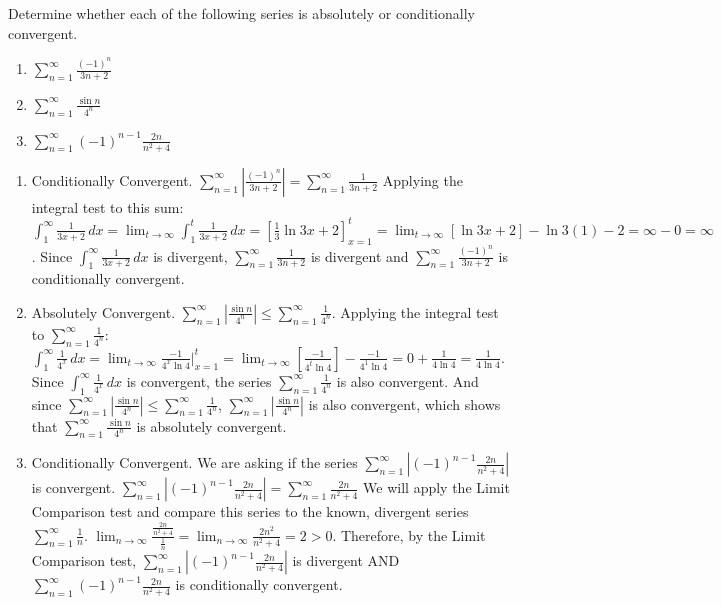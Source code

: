 \begin{Exercise}[label = absconv2]
Determine whether each of the following series is absolutely or conditionally 
convergent. 
\begin{enumerate}
\item $\sum_{n=1}^\infty \frac{(-1)^n}{3n + 2}$
\item $\sum_{n=1}^\infty \frac{\sin{n}}{4^n}$
\item $\sum_{n=1}^\infty (-1)^{n-1} \frac{2n}{n^2 + 4}$ 
\end{enumerate}
\vspace{50mm}
\end{Exercise}

\begin{Answer}[ref = absconv2]
\begin{enumerate}
\item Conditionally Convergent. $\sum_{n=1}^\infty \left| \frac{(-1)^n}{3n+2} 
\right| = \sum_{n=1}^\infty \frac{1}{3n + 2}$ Applying the integral test to 
this sum: $\int_1^\infty \frac{1}{3x+2}\,dx = \lim_{t \to \infty} \int_1^t 
\frac{1}{3x+2}\,dx = \left[ \frac{1}{3} \ln{3x + 2} \right]_{x=1}^t = \lim_{t 
\to \infty} \left[ \ln{3x + 2} \right] - \ln{3(1) - 2} = \infty - 0 = \infty$. 
Since $\int_1^\infty \frac{1}{3x + 2}\,dx$ is divergent, $\sum_{n=1}^\infty 
\frac{1}{3n + 2}$ is divergent and $\sum_{n=1}^\infty \frac{(-1)^n}{3n + 2}$ 
is conditionally convergent.
\item Absolutely Convergent. $\sum_{n=1}^\infty \left| \frac{\sin{n}}{4^n} 
\right| \leq \sum_{n=1}^\infty \frac{1}{4^n}$. Applying the integral test to 
$\sum_{n=1}^\infty \frac{1}{4^n}$: $\int_1^\infty \frac{1}{4^x}\,dx = \lim_{t 
\to \infty} \frac{-1}{4^x \ln{4}}|_{x=1}^t = \lim_{t \to \infty} \left[ \frac{
-1}{4^t \ln{4}} \right] - \frac{-1}{4^1 \ln{4}} = 0 + \frac{1}{4 \ln{4}} = 
\frac{1}{4 \ln{4}}$. Since $\int_1^\infty \frac{1}{4^x}\,dx$ is convergent, 
the series $\sum_{n=1}^\infty \frac{1}{4^n}$ is also convergent. And since 
$\sum_{n=1}^\infty \left| \frac{\sin{n}}{4^n} \right| \leq \sum_{n=1}^\infty 
\frac{1}{4^n}$, $\sum_{n=1}^\infty \left| \frac{\sin{n}}{4^n} \right|$ is 
also convergent, which shows that $\sum_{n=1}^\infty \frac{\sin{n}}{4^n}$ is 
absolutely convergent. 
\item Conditionally Convergent. We are asking if the series $\sum_{n=1}^\infty 
\left| (-1)^{n-1} \frac{2n}{n^2 + 4} \right|$ is convergent. $\sum_{n=1}^
\infty \left| (-1)^{n-1} \frac{2n}{n^2 + 4} \right| = \sum_{n=1}^\infty 
\frac{2n}{n^2 + 4}$ We will apply the Limit Comparison test and compare this 
series to the known, divergent series $\sum_{n=1}^\infty \frac{1}{n}$. $\lim_{
n \to \infty} \frac{\frac{2n}{n^2 + 4}}{\frac{1}{n}} = \lim_{n \to \infty} 
\frac{2n^2}{n^2 + 4} = 2 >0$. Therefore, by the Limit Comparison test, $\sum_{
n=1}^\infty \left| (-1)^{n-1} \frac{2n}{n^2 + 4} \right|$ is divergent AND 
$\sum_{n=1}^\infty (-1)^{n-1} \frac{2n}{n^2 + 4}$  is conditionally convergent. 
\end{enumerate}
\end{Answer}


